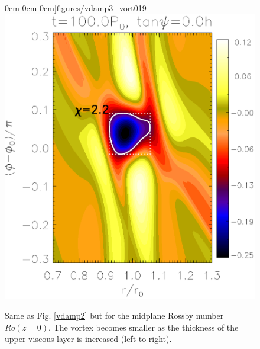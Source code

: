 \begin{figure}
     0cm 0cm
     0cm]{figures/vdamp3_vort019}\includegraphics[scale=.27,clip=true,clip=true,trim=2.3cm
     0cm 0cm
     0cm]{figures/vdamp0_nu4_vort019}%
    \caption{Same as Fig. \ref{vdamp2} but for the midplane Rossby
      number $Ro(z=0)$. The vortex becomes smaller as the thickness of
      the upper viscous layer is increased (left to right).  
      \label{vdamp2_vort}}
\end{figure}

